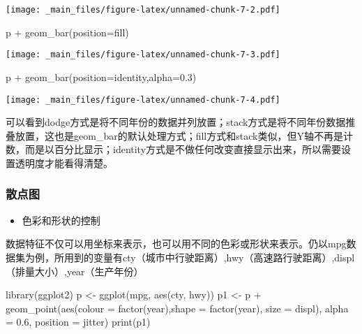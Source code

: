 \documentclass[
]{book}
\newenvironment{Shaded}{\begin{snugshade}}{\end{snugshade}}
\newcommand{\AttributeTok}[1]{\textcolor[rgb]{0.77,0.63,0.00}{#1}}
\newcommand{\FloatTok}[1]{\textcolor[rgb]{0.00,0.00,0.81}{#1}}
\newcommand{\FunctionTok}[1]{\textcolor[rgb]{0.00,0.00,0.00}{#1}}
\newcommand{\NormalTok}[1]{#1}
\newcommand{\OtherTok}[1]{\textcolor[rgb]{0.56,0.35,0.01}{#1}}
\newcommand{\SpecialCharTok}[1]{\textcolor[rgb]{0.00,0.00,0.00}{#1}}
\newcommand{\StringTok}[1]{\textcolor[rgb]{0.31,0.60,0.02}{#1}}
\providecommand{\tightlist}{%
  \setlength{\itemsep}{0pt}\setlength{\parskip}{0pt}}
\begin{document}
\texttt{[image: \_main\_files/figure-latex/unnamed-chunk-7-2.pdf]}

\begin{Shaded}
\begin{Highlighting}[]
\NormalTok{p }\SpecialCharTok{+} \FunctionTok{geom\_bar}\NormalTok{(}\AttributeTok{position=}\StringTok{\textquotesingle{}fill\textquotesingle{}}\NormalTok{)}
\end{Highlighting}
\end{Shaded}

\texttt{[image: \_main\_files/figure-latex/unnamed-chunk-7-3.pdf]}

\begin{Shaded}
\begin{Highlighting}[]
\NormalTok{p }\SpecialCharTok{+} \FunctionTok{geom\_bar}\NormalTok{(}\AttributeTok{position=}\StringTok{\textquotesingle{}identity\textquotesingle{}}\NormalTok{,}\AttributeTok{alpha=}\FloatTok{0.3}\NormalTok{)}
\end{Highlighting}
\end{Shaded}

\texttt{[image: \_main\_files/figure-latex/unnamed-chunk-7-4.pdf]}

可以看到dodge方式是将不同年份的数据并列放置；stack方式是将不同年份数据推叠放置，这也是geom\_bar的默认处理方式；fill方式和stack类似，但Y轴不再是计数，而是以百分比显示；identity方式是不做任何改变直接显示出来，所以需要设置透明度才能看得清楚。

\hypertarget{ux6563ux70b9ux56fe}{%
\subsubsection{散点图}\label{ux6563ux70b9ux56fe}}

\begin{itemize}
\tightlist
\item
  色彩和形状的控制
\end{itemize}

数据特征不仅可以用坐标来表示，也可以用不同的色彩或形状来表示。仍以mpg数据集为例，所用到的变量有cty（城市中行驶距离）,hwy（高速路行驶距离）,displ（排量大小）,year（生产年份）

\begin{Shaded}
\begin{Highlighting}[]
\FunctionTok{library}\NormalTok{(ggplot2)}
\NormalTok{p }\OtherTok{\textless{}{-}} \FunctionTok{ggplot}\NormalTok{(mpg, }\FunctionTok{aes}\NormalTok{(cty, hwy))}
\NormalTok{p1 }\OtherTok{\textless{}{-}}\NormalTok{ p }\SpecialCharTok{+} \FunctionTok{geom\_point}\NormalTok{(}\FunctionTok{aes}\NormalTok{(}\AttributeTok{colour =} \FunctionTok{factor}\NormalTok{(year),}\AttributeTok{shape =} \FunctionTok{factor}\NormalTok{(year), }\AttributeTok{size =}\NormalTok{ displ), }\AttributeTok{alpha =} \FloatTok{0.6}\NormalTok{, }\AttributeTok{position =} \StringTok{\textquotesingle{}jitter\textquotesingle{}}\NormalTok{)}
\FunctionTok{print}\NormalTok{(p1)}
\end{Highlighting}
\end{Shaded}
\end{document}
